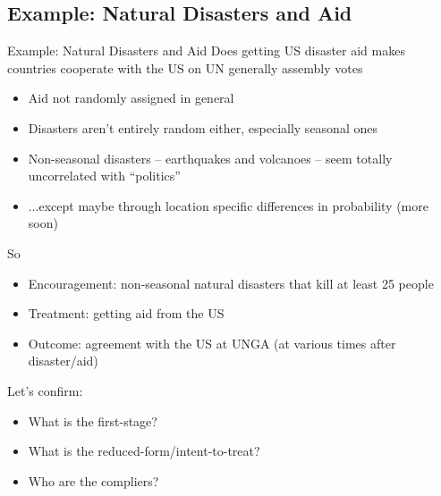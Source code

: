 \documentclass[xcolor=dvipsnames]{beamer}
\begin{document}
\subsection{Example: Natural Disasters and Aid}

\begin{frame}{Example: Natural Disasters and Aid}
 Does getting US disaster aid makes countries cooperate with the US on UN generally assembly votes \\
\footnotesize
\begin{itemize}
\item<2-> Aid not randomly assigned in general
\item<3-> Disasters aren't entirely random either, especially seasonal ones
\item<4-> Non-seasonal disasters -- earthquakes and volcanoes -- seem totally uncorrelated with ``politics''
\item<5-> ...except maybe through location specific differences in probability (more soon)
\end{itemize}
\normalsize
\medskip
{} So
\footnotesize
\begin{itemize}
\item<7-> Encouragement:  non-seasonal natural disasters that kill at least 25 people
\item<8-> Treatment: getting aid from the US
\item<9-> Outcome: agreement with the US at UNGA (at various times after disaster/aid)
\end{itemize}
\normalsize
\medskip
{} Let's confirm:
\footnotesize
\begin{itemize}
\item<11-> What is the first-stage?
\item<12-> What is the reduced-form/intent-to-treat?
\item<13-> Who are the compliers? %
\end{itemize}
\end{frame}
\end{document}
